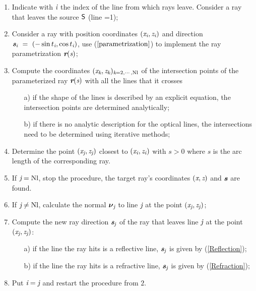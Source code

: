\begin{enumerate}
\item Indicate with $\textit{i}$ the index of the line from which rays leave. Consider a ray that leaves the source $\textsf{S}$ (line =1);
 \item Consider a ray with position coordinates $(\textit{x}_{\textit{i}}, \textit{z}_{\textit{i}})$ and direction $\textit{\textbf{s}}_{\textit{i}}~=~(-\sin t_{\textit{i}}, \cos t_{\textit{i}})$, use ($\ref{parametrization}$) to implement the ray parametrization $\textit{\textbf{r}}(\textit{s})$;
\item Compute the coordinates $(\textit{x}_{\textit{k}}, \textit{z}_{\textit{k}})_{\textit{k} = 2, \cdots, \textrm{Nl}}$ of the intersection points of the parameterized ray $\textit{\textbf{r}}(\textit{s})$ with all the lines that it crosses
\begin{itemize}
\item[a)] if the shape of the lines is described by an explicit equation, the intersection points are determined analytically;
\item[b)] if there is no analytic description for the optical lines, the intersections need to be determined using iterative methods;
\end{itemize}
\item  Determine the point $(\textit{x}_{\textit{j}}, \textit{z}_{\textit{j}})$ closest to $(\textit{x}_{\textit{i}}, \textit{z}_{\textit{i}})$ with $s>0$ where $s$ is the arc length of the corresponding ray.
\item If $\textit{j} = \textrm{Nl}$, stop the procedure, the target ray's coordinates $(\textit{x}, \textit{z})$ and $\textit{\textbf{s}}$ are found.
\item If $\textit{j} \neq \textrm{Nl}$, calculate the normal $\boldsymbol{\nu}_{\textit{j}}$ to line $\textit{j}$ at the point $(\textit{x}_{\textit{j}}, \textit{z}_{\textit{j}})$;
 \item Compute the new ray direction $\textit{\textbf{s}}_{\textit{j}}$ of the ray that leaves line $\textit{j}$ at the point $(\textit{x}_{\textit{j}}, \textit{z}_{\textit{j}})$:
\begin{itemize}
\item[a)] if the line the ray hits is a reflective line, $\textit{\textbf{s}}_{\textit{j}}$ is given by (\ref{Reflection});
\item[b)] if the line the ray hits is a refractive line, $\textit{\textbf{s}}_{\textit{j}}$ is given by (\ref{Refraction});
\end{itemize}
\item Put $\textit{i}=\textit{j}$ and restart the procedure from $2.$
\end{enumerate}
